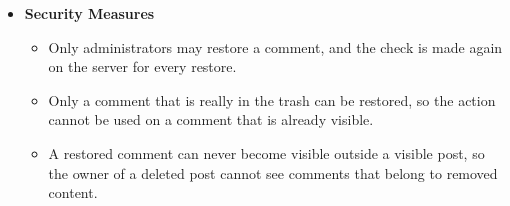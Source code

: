 \begin{itemize}[leftmargin=1.6em,topsep=4pt,itemsep=3pt,parsep=0pt,label=$\bullet$]
\begin{itemize}[leftmargin=2.2em,topsep=2pt,itemsep=3pt,parsep=0pt,label=$\circ$]
        \end{itemize}
    \item \textbf{Security Measures}
        \begin{itemize}[leftmargin=2.2em,topsep=2pt,itemsep=3pt,parsep=0pt,label=$\circ$]
            \item Only administrators may restore a comment, and the check is made again on the server for every restore.
            \item Only a comment that is really in the trash can be restored, so the action cannot be used on a comment that is already visible.
            \item A restored comment can never become visible outside a visible post, so the owner of a deleted post cannot see comments that belong to removed content.
        \end{itemize}
\end{itemize}
